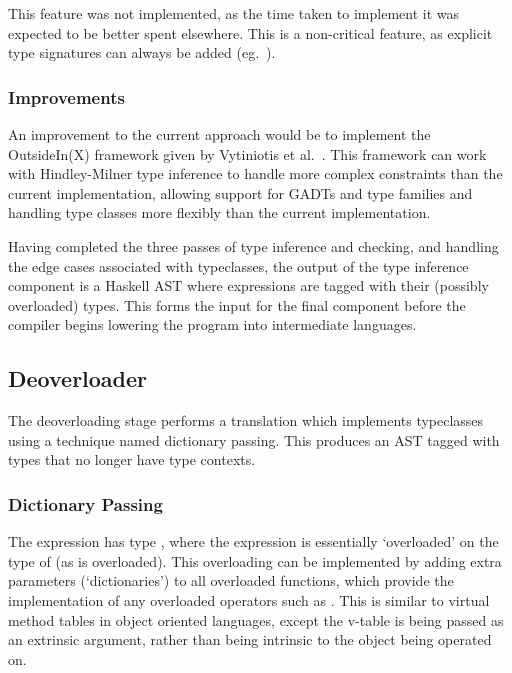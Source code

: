 \documentclass[dissertation.tex]{subfiles}
\begin{document}
{{{            This feature was not implemented, as the time taken to implement it was expected to be better spent elsewhere. This is a non-critical feature, as explicit type signatures can always be added (eg.\ ).
        }
        \subsubsection{Improvements}
        {
            An improvement to the current approach would be to implement the OutsideIn(X) framework given by Vytiniotis et al.\ \cite{OutsideIn}. This framework can work with Hindley-Milner type inference to handle more complex constraints than the current implementation, allowing support for GADTs and type families and handling type classes more flexibly than the current implementation.
        }

        \vspace{0.5cm}
        Having completed the three passes of type inference and checking, and handling the edge cases associated with typeclasses, the output of the type inference component is a Haskell AST where expressions are tagged with their (possibly overloaded) types. This forms the input for the final component before the compiler begins lowering the program into intermediate languages. 
    }
    \subsection{Deoverloader}\label{sec:deoverloading}
    {
        The deoverloading stage performs a translation which implements typeclasses using a technique named dictionary passing. This produces an AST tagged with types that no longer have type contexts.

        \subsubsection{Dictionary Passing}
        {
            The expression  has type , where the expression is essentially `overloaded' on the type of  (as \haskell{(+)} is overloaded). This overloading can be implemented by adding extra parameters (`dictionaries') to all overloaded functions, which provide the implementation of any overloaded operators such as \haskell{(+)}. This is similar to virtual method tables in object oriented languages, except the v-table is being passed as an extrinsic argument, rather than being intrinsic to the object being operated on.

}}}
\end{document}
